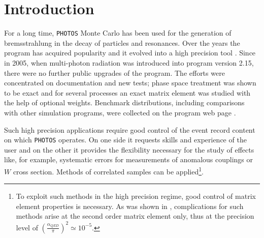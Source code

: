 \documentclass[]{Photos_interface_design}
\begin{document}
\maketitle

\tableofcontents{}

\newpage

\section{Introduction}
For a long time, {\tt PHOTOS} Monte Carlo \cite{Barberio:1990ms,Barberio:1993qi} 
has been used for the generation of bremsstrahlung in the decay of particles and resonances.
Over the years the program has acquired
popularity and it evolved into a high 
precision tool \cite{Golonka:2006tw}. Since in 2005, when
multi-photon radiation was 
introduced \cite{Golonka:2005pn} into program version 2.15, there were no 
further public upgrades 
of the program. The efforts were concentrated on documentation and 
new tests;
 phase space treatment was shown to be 
exact \cite{Nanava:2006vv} and for several 
processes \cite{Golonka:2006tw,Nanava:2006vv,Nanava:2009vg}
an exact matrix element was studied with the help of optional weights.
Benchmark distributions, including comparisons with  
other simulation programs, were collected on the program web page \cite{Photos_tests}. 

 Such high precision applications require good control of the event record content on which {\tt PHOTOS} operates. On one side it 
requests skills and experience of the user and on the other it provides 
the flexibility necessary for the study of effects like, for example, systematic errors for 
measurements of anomalous couplings or $W$ cross section. Methods of 
correlated samples  can be applied\footnote{To exploit such methods in 
the high precision regime, good control of matrix element properties is necessary.
As was shown in \cite{Kleiss:1990jv}, complications for such methods arise at the second order matrix element only, thus at the precision level of 
$(\frac{\alpha_{QED}}{\pi})^2 \simeq 10^{-5}$.}. 
\end{document}
